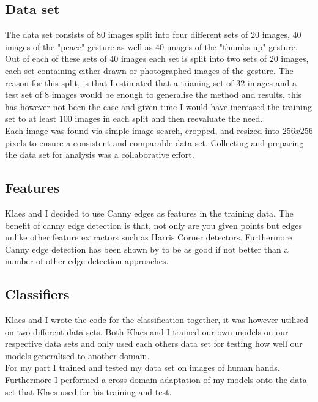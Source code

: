 \documentclass[11pt, a4paper]{article}
\begin{document}
\subsection{Data set}
The data set consists of \(80\) images split into four different sets of \(20\) images, \(40\) images of the "peace" gesture as well as \(40\) images of the "thumbs up" gesture. Out of each of these sets of \(40\) images each set is split into two sets of \(20\) images, each set containing either drawn or photographed images of the gesture. The reason for this split, is that I estimated that a trianing set of \(32\) images and a test set of \(8\) images would be enough to generalise the method and results, this has however not been the case and given time I would have increased the training set to at least \(100\) images in each split and then reevaluate the need.\\
Each image was found via simple image search, cropped, and resized into \(256x256\) pixels to ensure a consistent and comparable data set. Collecting and preparing the data set for analysis was a collaborative effort.\\
\subsection{Features}
Klaes and I decided to use Canny edges as features in the training data. The benefit of canny edge detection is that, not only are you given points but edges unlike other feature extractors such as Harris Corner detectors. Furthermore Canny edge detection has been shown by  to be as good if not better than a number of other edge detection approaches.\\
\subsection{Classifiers}
Klaes and I wrote the code for the classification together, it was however utilised on two different data sets. Both Klaes and I trained our own models on our respective data sets and only used each others data set for testing how well our models generalised to another domain.\\
For my part I trained and tested my data set on images of human hands. Furthermore I performed a cross domain adaptation of my models onto the data set that Klaes used for his training and test.\\
\end{document}
